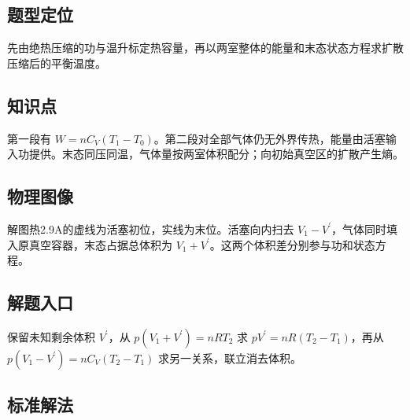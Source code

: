 \documentclass[UTF8,fontset=fandol,a4paper,11pt]{ctexart}
\begin{document}


\subsection*{题型定位}

先由绝热压缩的功与温升标定热容量，再以两室整体的能量和末态状态方程求扩散压缩后的平衡温度。



\subsection*{知识点}

第一段有 $W=nC_V(T_1-T_0)$。第二段对全部气体仍无外界传热，能量由活塞输入功提供。末态同压同温，气体量按两室体积配分；向初始真空区的扩散产生熵。




\subsection*{物理图像}

解图热2.9A的虚线为活塞初位，实线为末位。活塞向内扫去 $V_1-V^{\prime}$，气体同时填入原真空容器，末态占据总体积为 $V_1+V^{\prime}$。这两个体积差分别参与功和状态方程。



\subsection*{解题入口}

保留未知剩余体积 $V^{\prime}$，从 $p(V_1+V^{\prime})=nRT_2$ 求 $pV^{\prime}=nR(T_2-T_1)$，再从 $p(V_1-V^{\prime})=nC_V(T_2-T_1)$ 求另一关系，联立消去体积。




\subsection*{标准解法}
\end{document}
